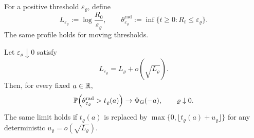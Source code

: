 \documentclass[11pt,reqno,a4paper]{article}
\newcommand{\Pp}{\P}
\begin{document}
For a positive threshold $\varepsilon_\varrho$, define
\begin{equation*}
  L_{\varepsilon_\varrho}
  :=
  \log\frac{R_0}{\varepsilon_\varrho},
  \qquad
  \theta_{\varepsilon_\varrho}^{\mathrm{rad}}
  :=
  \inf\{t\geq0:R_t\leq\varepsilon_\varrho\}.
\end{equation*}
The same profile holds for moving thresholds.
\begin{proposition}
\label{prop:rounded-gaussian-threshold-cutoff}
  Let $\varepsilon_\varrho\downarrow0$ satisfy
  \begin{equation*}
    L_{\varepsilon_\varrho}
    =L_\varrho+o(\sqrt{L_\varrho}).
  \end{equation*}
  Then, for every fixed $a\in\mathbb{R}$,
  \begin{equation}\label{eq:rounded-gaussian-moving-threshold-profile}
    \Pp\left(
      \theta_{\varepsilon_\varrho}^{\mathrm{rad}}>t_\varrho(a)
    \right)
    \to
    \Phi_{\mathrm G}(-a),
    \qquad
    \varrho\downarrow0.
  \end{equation}
  The same limit holds if $t_\varrho(a)$ is replaced by
  $\max\{0,\lfloor t_\varrho(a)+u_\varrho\rfloor\}$ for any deterministic
  $u_\varrho=o(\sqrt{L_\varrho})$.
\end{proposition}
\end{document}
